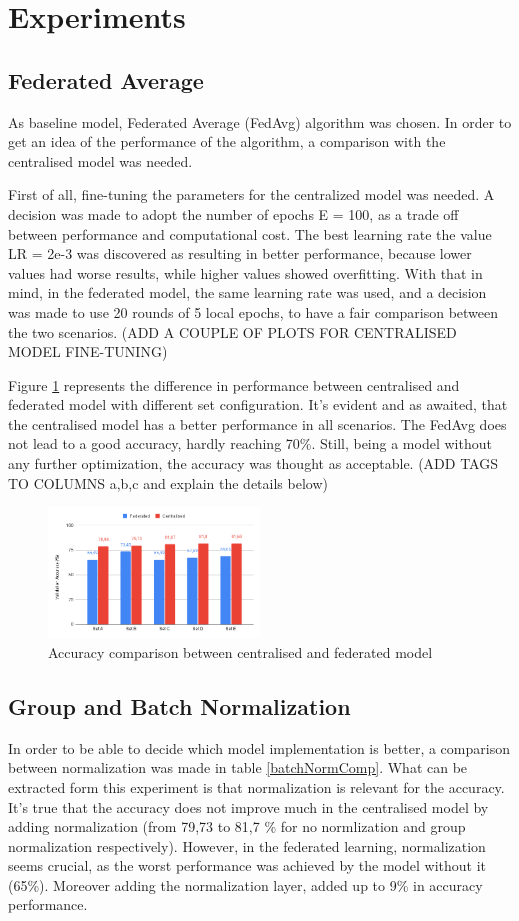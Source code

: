 \documentclass[twocolumn]{article}
\begin{document}
\section{Experiments} %
\subsection{Federated Average}
As baseline model, Federated Average (FedAvg) algorithm was chosen. In order to get an idea of the performance of the algorithm, a comparison with the centralised model was needed. 

First of all, fine-tuning the parameters for the centralized model was needed. A decision was made to adopt the number of epochs E = 100, as a trade off between performance and computational cost. The best learning rate the value LR = 2e-3 was discovered as resulting in better performance, because lower values had worse results, while higher values showed overfitting. With that in mind, in the federated model, the same learning rate was used, and a decision was made to use 20 rounds of 5 local epochs, to have a fair comparison between the two scenarios.
(ADD A COUPLE OF PLOTS FOR CENTRALISED MODEL FINE-TUNING)

Figure \ref{AccCompFedCent} represents the difference in performance between centralised and federated model with different set configuration. It's evident and as awaited, that the centralised model has a better performance in all scenarios. The FedAvg does not lead to a good accuracy, hardly reaching 70\%. Still, being a model without any further optimization, the accuracy was thought as acceptable. (ADD TAGS TO COLUMNS a,b,c and explain the details below)


\begin{figure}
    \centering
    \includegraphics[width=0.5\textwidth,height=.3\textheight]{FedAccuracyComp.png}
    \caption{Accuracy comparison between centralised and federated model}
     \label{AccCompFedCent} 
\end{figure}
\subsection{Group and Batch Normalization}
In order to be able to decide which model implementation is better, a comparison between normalization was made in table \ref{batchNormComp}. What can be extracted form this experiment is that normalization is relevant for the accuracy. It's true that the accuracy does not improve much in the centralised model by adding normalization (from 79,73 to 81,7 \% for no normlization and group normalization respectively). However, in the federated learning, normalization seems crucial, as the worst performance was achieved by the model without it (65\%). Moreover adding the normalization layer, added up to 9\% in accuracy performance. 
\end{document}
